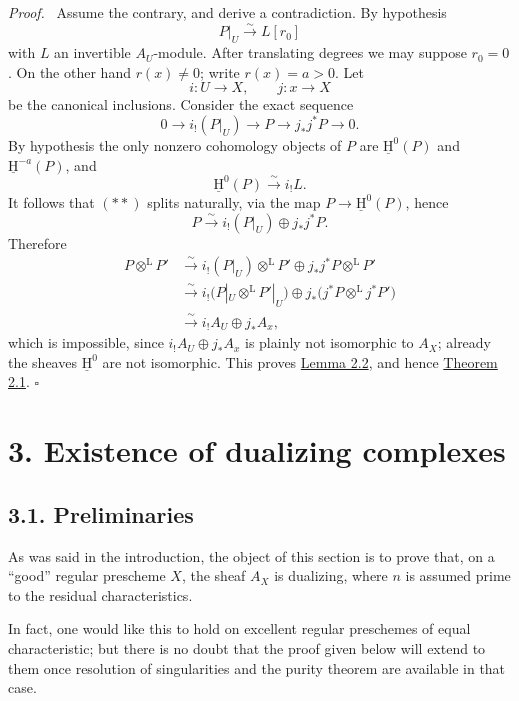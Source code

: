 \documentclass[11pt]{article}
\providecommand{\uH}{\underline{\mathrm H}}
\providecommand{\qedtext}{\hfill$\square$}
\newenvironment{prooftext}[1][Proof]{\par\noindent\emph{#1.}\ }{\par\medskip}
\providecommand{\qedtext}{\hfill$\square$}
\begin{document}
\begin{prooftext}
Assume the contrary, and derive a contradiction. By hypothesis
\[
   P|_U\xrightarrow{\sim}L[r_0]
\]
with $L$ an invertible $A_U$-module. After translating degrees we may suppose $r_0=0$. On the other hand $r(x)\ne0$; write $r(x)=a>0$. Let
\[
   i:U\to X,
   \qquad
   j:x\to X
\]
be the canonical inclusions. Consider the exact sequence
\begin{equation}
0\longrightarrow i_!(P|_U)\longrightarrow P\longrightarrow j_*j^*P\longrightarrow0.\tag{**}\label{sga5:I:equation:unnumbered:4}
\end{equation}
By hypothesis the only nonzero cohomology objects of $P$ are $\uH^0(P)$ and $\uH^{-a}(P)$, and
\[
   \uH^0(P)\xrightarrow{\sim}i_!L.
\]
It follows that $(**)$ splits naturally, via the map $P\to\uH^0(P)$, hence
\[
   P\xrightarrow{\sim} i_!(P|_U)\oplus j_*j^*P.
\]
Therefore
\begin{align*}
P\otimes^{\mathrm L}P'
&\xrightarrow{\sim} i_!(P|_U)\otimes^{\mathrm L}P'
      \oplus j_*j^*P\otimes^{\mathrm L}P' \\
&\xrightarrow{\sim} i_!\bigl(P|_U\otimes^{\mathrm L}P'|_U\bigr)
      \oplus j_*\bigl(j^*P\otimes^{\mathrm L}j^*P'\bigr)\\
&\xrightarrow{\sim} i_!A_U\oplus j_*A_x,
\end{align*}
which is impossible, since $i_!A_U\oplus j_*A_x$ is plainly not isomorphic to $A_X$; already the sheaves $\uH^0$ are not isomorphic. This proves \hyperref[sga5:I:lemma:2.2]{Lemma 2.2}, and hence \hyperref[sga5:I:theorem:2.1]{Theorem 2.1}. \qedtext
\end{prooftext}

\section*{3. Existence of dualizing complexes}\label{sga5:I:section:3}

\subsection*{3.1. Preliminaries}\label{sga5:I:subsection:3.1}

As was said in the introduction, the object of this section is to prove that, on a ``good'' regular prescheme $X$, the sheaf $A_X$ is dualizing, where $n$ is assumed prime to the residual characteristics.

In fact, one would like this to hold on excellent regular preschemes of equal characteristic; but there is no doubt that the proof given below will extend to them once resolution of singularities and the purity theorem are available in that case.
\end{document}
